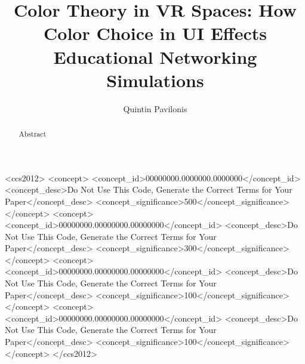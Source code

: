 \documentclass[acmlarge]{acmart}
\begin{document}
\title{Color Theory in VR Spaces: How Color Choice in UI Effects Educational Networking Simulations}

\author{Quintin Pavilonis}

\renewcommand{\shortauthors}{Pavilonis}

\begin{abstract}
  Abstract
\end{abstract}

\begin{CCSXML}
<ccs2012>
 <concept>
  <concept_id>00000000.0000000.0000000</concept_id>
  <concept_desc>Do Not Use This Code, Generate the Correct Terms for Your Paper</concept_desc>
  <concept_significance>500</concept_significance>
 </concept>
 <concept>
  <concept_id>00000000.00000000.00000000</concept_id>
  <concept_desc>Do Not Use This Code, Generate the Correct Terms for Your Paper</concept_desc>
  <concept_significance>300</concept_significance>
 </concept>
 <concept>
  <concept_id>00000000.00000000.00000000</concept_id>
  <concept_desc>Do Not Use This Code, Generate the Correct Terms for Your Paper</concept_desc>
  <concept_significance>100</concept_significance>
 </concept>
 <concept>
  <concept_id>00000000.00000000.00000000</concept_id>
  <concept_desc>Do Not Use This Code, Generate the Correct Terms for Your Paper</concept_desc>
  <concept_significance>100</concept_significance>
 </concept>
</ccs2012>
\end{CCSXML}

\end{document}
